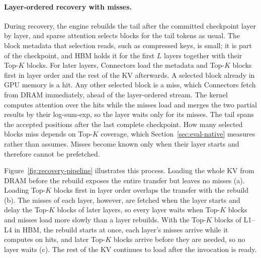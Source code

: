 \paragraph{Layer-ordered recovery with misses.}
During recovery, the engine rebuilds the tail after the committed checkpoint layer
by layer, and sparse attention selects blocks for the tail tokens as
usual. The block metadata that selection reads, such as compressed keys,
is small; it is part of the checkpoint, and HBM holds it for the first $L$
layers together with their Top-$K$ blocks. For later layers, Connectors
load the metadata and Top-$K$ blocks first in layer order and the rest of
the KV afterwards. A selected block already in GPU memory is a hit. Any
other selected block is a miss, which Connectors fetch from DRAM
immediately, ahead of the layer-ordered stream. The kernel computes
attention over the hits while the misses load and merges the two partial
results by their log-sum-exp, so the layer waits only for its misses.
The tail spans the accepted positions after the last complete checkpoint. How many selected blocks miss depends on
Top-$K$ coverage, which Section~\ref{sec:eval-native} measures rather than
assumes. Misses become known only when their layer starts and therefore
cannot be prefetched.

Figure~\ref{fig:recovery-pipeline} illustrates this process. Loading the
whole KV from DRAM before the rebuild exposes the entire transfer but
leaves no misses (a). Loading Top-$K$ blocks first in layer order overlaps
the transfer with the rebuild (b). The misses of each layer, however, are
fetched when the layer starts and delay the Top-$K$ blocks of later
layers, so every layer waits when Top-$K$ blocks and misses load more
slowly than a layer rebuilds. With the Top-$K$ blocks of L1--L4 in HBM,
the rebuild starts at once, each layer's misses arrive while it computes
on hits, and later Top-$K$ blocks arrive before they are needed, so no
layer waits (c). The rest of the KV continues to load after the
invocation is ready.

